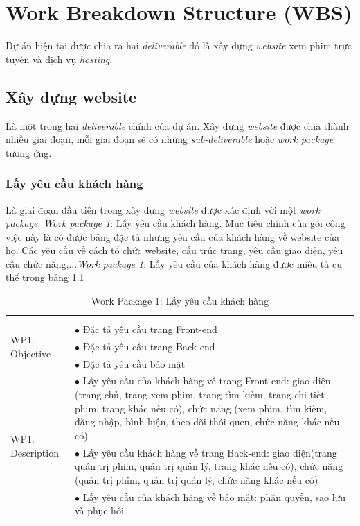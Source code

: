 \documentclass[a4paper]{book}
\begin{document}
\chapter{Work Breakdown Structure (WBS)}
Dự án hiện tại được chia ra hai \textit{deliverable} đó là xây dựng \textit{website} xem phim trực tuyến và dịch vụ \textit{hosting}.
\section{Xây dựng website}
Là một trong hai \textit{deliverable} chính của dự án. Xây dựng \textit{website} được chia thành nhiều giai đoạn, mỗi giai đoạn sẽ có những \textit{sub-deliverable} hoặc \textit{work package} tương ứng.
\subsection{Lấy yêu cầu khách hàng}
Là giai đoạn đầu tiên trong xây dựng \textit{website} được xác định với một \textit{work package}. \textit{Work package 1}: Lấy yêu cầu khách hàng. Mục tiêu chính của gói công việc này là có được bảng đặc tả những yêu cầu của khách hàng về website của họ. Các yêu cầu về cách tổ chức website, cấu trúc trang, yêu cầu giao diện, yêu cầu chức năng,...\textit{Work package 1}: Lấy yêu cầu của khách hàng được miêu tả cụ thể trong bảng \ref{table:lay_yeu_cau}
\begin{table}[h!]
	\begin{center}
		\begin{tabular}{|p{4cm}|p{10cm}|}
			\hline
			\multicolumn{2}{|c|}{\cellcolor[HTML]{363636}{\color[HTML]{FFFFFF}Work package 1: Lấy yêu cầu khách hàng}}\\
			\hline
			\multirow{3}{*}{WP1. Objective} & $\bullet$ Đặc tả yêu cầu trang Front-end\\
			 & $\bullet$ Đặc tả yêu cầu trang Back-end \\
			 & $\bullet$ Đặc tả yêu cầu bảo mật	\\
			\hline
			\multirow{3}{*}{WP1. Description} & $\bullet$ Lấy yêu cầu của khách hàng về trang Front-end: giao diện (trang chủ, trang xem phim, trang tìm kiếm, trang chi tiết phim, trang khác nếu có), chức năng (xem phim, tìm kiếm, đăng nhập, bình luận, theo dõi thói quen, chức năng khác nếu có) \\
			& $\bullet$ Lấy yêu cầu khách hàng về trang Back-end: giao diện(trang quản trị phim, quản trị quản lý, trang khác nếu có), chức năng (quản trị phim, quản trị quản lý, chức năng khác nếu có)\\
			& $\bullet$ Lấy yêu cầu của khách hàng về bảo mật: phân quyền, sao lưu và phục hồi.\\
			\hline
		\end{tabular}
	\caption{Work Package 1: Lấy yêu cầu khách hàng}
	\label{table:lay_yeu_cau}
	\end{center}
\end{table}
\end{document}
